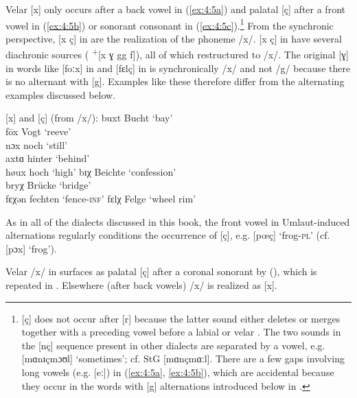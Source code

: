 Velar [x] only occurs after a back vowel in (\ref{ex:4:5a}) and palatal [ç] after a front vowel in (\ref{ex:4:5b}) or sonorant consonant in (\ref{ex:4:5c}).\footnote{{[ç] does not occur after [r] because the latter sound either deletes or merges together with a preceding vowel before a labial or velar \citep[42--48]{Larsson1917}. The two sounds in the [nç] sequence present in other dialects are separated by a vowel, e.g.  [mɑnɪçmɔʊl] ‘sometimes’; cf. StG [mɑnçmɑːl]. There are a few gaps involving long vowels (e.g. [eː]) in (\ref{ex:4:5a}, \ref{ex:4:5b}), which are accidental because they occur in the words with [g] alternations introduced below in .} } From the synchronic perspective, [x ç] in  are the realization of the phoneme /x/.  [x ç] in  have several diachronic sources ( \textsuperscript{+}[x ɣ gg f]), all of which restructured to /x/. The original [ɣ] in words like [foːx] in  and [fɛlç] in  is synchronically /x/ and not /g/ because there is no alternant with [g]. Examples like these therefore differ from the alternating examples discussed below.

\ea%
    \label{ex:4:5}[x] and [ç] (from /x/):
\ea \label{ex:4:5a}
buxt   \tab [bʊxt]  \tab Bucht   \tab ‘bay’                \\
fōx    \tab [foːx]  \tab Vogt    \tab ‘reeve’              \\
nɔx    \tab [nɔx]   \tab noch    \tab ‘still’              \\
axtɑ   \tab [ɑxtɐ]  \tab hinter  \tab ‘behind’             \\
høux   \tab [høʊx]  \tab hoch    \tab ‘high’               
\ex \label{ex:4:5b} 
bɪχ    \tab [bɪç]   \tab Beichte \tab ‘confession’         \\
bryχ   \tab [brʏç]  \tab Brücke  \tab ‘bridge’             \\
fɛχən  \tab [fɛçən] \tab fechten \tab ‘fence-\textsc{inf}’ 
\ex \label{ex:4:5c} 
fɛlχ   \tab [fɛlç]  \tab Felge   \tab ‘wheel rim’          
\z
\z

As in all of the dialects discussed in this book, the front vowel in Umlaut-induced alternations regularly conditions the occurrence of [ç], e.g. [pœç] ‘frog-\textsc{pl}’ (cf. [pɔx] ‘frog’).

Velar /x/ in  surfaces as palatal [ç] after a coronal sonorant by  (), which is repeated in . Elsewhere (after back vowels) /x/ is realized as [x].

